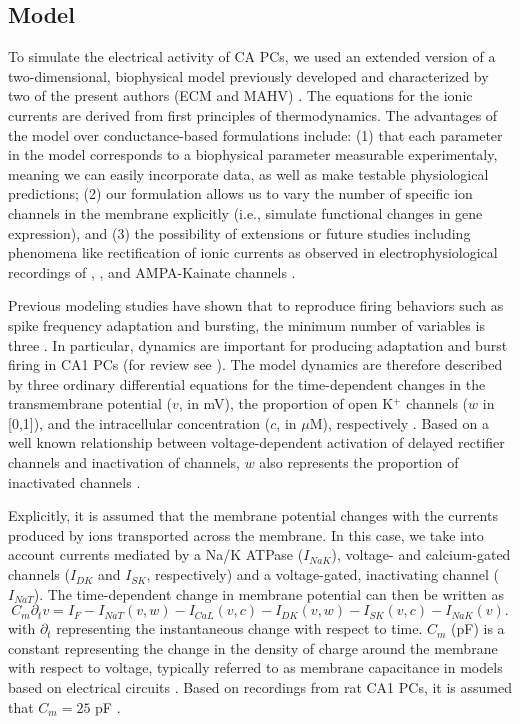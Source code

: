 \documentclass[12pt]{article}
\begin{document}
\subsection{Model}
To simulate the electrical activity of CA PCs, we used an extended version of a two-dimensional, biophysical model previously developed and characterized by two of the present authors (ECM and MAHV) \cite{herrera2012membranes,herrera2013relating,herrera2018thermodynamic}. The equations for the ionic currents are derived from first principles of thermodynamics.  The advantages of the model over  conductance-based formulations include: (1) that each parameter in the model corresponds to a biophysical parameter measurable experimentaly, meaning we can easily incorporate data, as well as make testable physiological predictions; (2) our  formulation allows us to vary the number of specific ion channels in the membrane explicitly (i.e., simulate functional changes in gene expression), and (3) the possibility of extensions or future studies including phenomena like rectification of ionic currents as observed in electrophysiological recordings of \kalium, \chloride, and AMPA-Kainate channels \citep{herrera2018thermodynamic}. 

Previous modeling studies have shown that to reproduce firing behaviors such as spike frequency adaptation and bursting, the minimum number of variables is three \cite{hindmarsh1984model,avron1993basic}. 
In particular, {\Ca} dynamics are important for producing adaptation and burst firing in CA1 PCs (for review see \cite{mckiernan2017ca1}). 
The model dynamics are therefore described by three ordinary differential equations for  the time-dependent changes in the transmembrane potential ($v$, in mV), the proportion of open  K$^+$ channels ($w$ in [0,1]), and the intracellular {\Ca} concentration ($c$, in $\mu$M), respectively   \citep{herrera2018thermodynamic}. Based on a well known relationship between voltage-dependent activation of \kalium delayed rectifier channels and inactivation of \natrium channels, $w$ also represents the proportion of inactivated \natrium channels \cite{herrera2011reduced,rinzel1985excitation,avron1991minimal}.

Explicitly, it is assumed that the membrane potential changes with the currents produced  by ions transported across the membrane. In this case, we take into account currents mediated by a Na/K ATPase ($I_{NaK}$), voltage- and calcium-gated  \kalium channels ($I_{DK}$ and $I_{SK}$, respectively) and a voltage-gated, inactivating \natrium channel ($I_{NaT}$). The time-dependent change in membrane potential can then be written as
\begin{equation}
C_m \partial_t v= I_{F} - I_{NaT}(v,w) - I_{CaL}(v,c) - I_{DK}(v,w) - I_{SK}(v,c) - I_{NaK}(v). \label{eq:dvdt}
\end{equation}
with $\partial_t$ representing the instantaneous change with respect to time. $C_m$ (pF) is a constant representing the change in the density of charge around the membrane with respect to voltage, typically referred to as membrane capacitance in models based on electrical circuits  \cite{herrera2020nonequivalent}. Based on recordings from rat CA1 PCs, it is  assumed that $C_m=25$  pF  \cite{groc2002vivo}.
\end{document}
